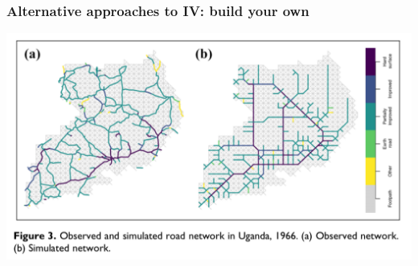 \documentclass[aspectratio=43]{beamer}
\begin{document}
\begin{frame}
\frametitle{Alternative approaches to IV: build your own}
\centering

\includegraphics[width = \textwidth]{../img/carl10}

\end{frame}

\end{document}

